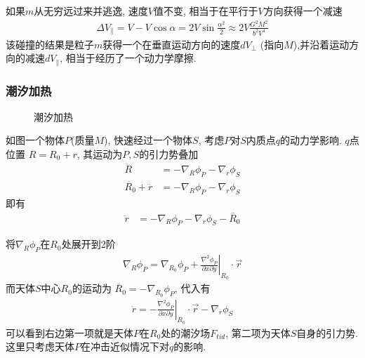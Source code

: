 如果$m$从无穷远过来并逃逸, 速度$V$值不变, 相当于在平行于$V$方向获得一个减速
\begin{align*}
    \Delta V_{\parallel }=V-V\cos\alpha=2V\sin\frac{\alpha^2}{2}\approx 2V\frac{G^2M^2}{b^2V^4}
\end{align*}
该碰撞的结果是粒子$m$获得一个在垂直运动方向的速度$dV_\perp$ (指向$M$),并沿着运动方向的减速$dV_\parallel$, 相当于经历了一个动力学摩擦. 

\subsubsection{潮汐加热}

\begin{figure}[!htb]
    \centering
    \caption{潮汐加热}
\end{figure}

如图一个物体$P$(质量$M$), 快速经过一个物体$S$, 考虑$P$对$S$内质点$q$的动力学影响. $q$点位置 $R=R_0+r$, 其运动为$P, S$的引力势叠加
\begin{align*}
    \ddot{R}&=-\nabla_R\phi_P-\nabla_r\phi_S\\
    \ddot{R_0}+\ddot{r}&=-\nabla_R\phi_P-\nabla_r\phi_S
\end{align*}
即有
\begin{align*}
    \ddot{r}&=-\nabla_R\phi_P-\nabla_r\phi_S-\ddot{R_0}
\end{align*}

将$\nabla_R\phi_P$在$R_0$处展开到2阶
\begin{align*}
    \nabla_R\phi_P=\nabla_{R_0}\phi_P+\left. \frac{\nabla^2 \phi_P}{\partial x\partial y}\right|_{R_0}\cdot\vec{r}
\end{align*}
而天体$S$中心$R_0$的运动为 $\ddot{R_0}=-\nabla_{R_0}\phi_P$, 代入有
\begin{align*}
    \ddot{r}=-\left. \frac{\nabla^2 \phi_P}{\partial x\partial y}\right|_{R_0}\cdot\vec{r}-\nabla_r\phi_S
\end{align*}
可以看到右边第一项就是天体$P$在$R_0$处的潮汐场$F_{tid}$, 第二项为天体$S$自身的引力势. 这里只考虑天体$P$在冲击近似情况下对$q$的影响. 

